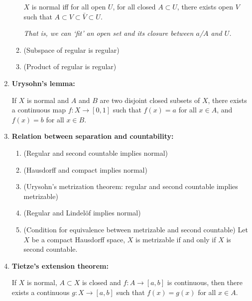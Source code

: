 \documentclass[letterpaper, 12pt]{article}
\begin{document}
\begin{enumerate}[resume]
\begin{enumerate}
            $X$ is normal iff for all open $U$, for all closed $A\subset U$, there exists open $V$ such that $A\subset V\subset \bar V \subset U$.

            \textit{That is, we can `fit' an open set and its closure between $a$/$A$ and $U$.}
        \item (Subspace of regular is regular)
        \item (Product of regular is regular)
        \end{enumerate}
    \item \textbf{Urysohn's lemma:}

        If $X$ is normal and $A$ and $B$ are two disjoint closed subsets of $X$, there exists a continuous map $f : X\to [0,1]$ such that $f(x) = a$ for all $x\in A$, and $f(x) = b$ for all $x\in B$. %
    \item \textbf{Relation between separation and countability:}
        \begin{enumerate}
        \item (Regular and second countable implies normal)
        \item (Hausdorff and compact implies normal)
        \item (Urysohn's metrization theorem: regular and second countable implies metrizable) %
        \item (Regular and Lindel\"of implies normal)
        \item (Condition for equivalence between metrizable and second countable) Let $X$ be a compact Hausdorff space, $X$ is metrizable if and only if $X$ is second countable.
        \end{enumerate}
    \item \textbf{Tietze's extension theorem:}

        If $X$ is normal, $A\subset X$ is closed and $f : A\to [a,b]$ is continuous, then there exists a continuous $g : X\to [a,b]$ such that $f(x) = g(x)$ for all $x\in A$. %
    \end{enumerate}

\end{document}
